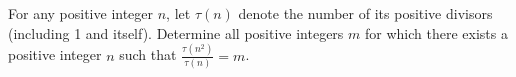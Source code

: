 For any positive integer $n$,  let $\tau (n)$ denote the number of its positive divisors (including 1 and itself). Determine all positive integers $m$ for which there exists a positive integer $n$ such that $\frac{\tau (n^{2})}{\tau (n)}=m$.